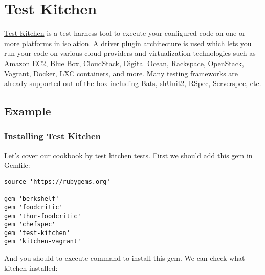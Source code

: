 \section{Test Kitchen}
\label{sec:testing-test-kitchen}

\href{http://kitchen.ci/}{Test Kitchen} is a test harness tool to execute your configured code on one or more platforms in isolation. A driver plugin architecture is used which lets you run your code on various cloud providers and virtualization technologies such as Amazon EC2, Blue Box, CloudStack, Digital Ocean, Rackspace, OpenStack, Vagrant, Docker, LXC containers, and more. Many testing frameworks are already supported out of the box including Bats, shUnit2, RSpec, Serverspec, etc.

\subsection{Example}

\subsubsection{Installing Test Kitchen}

Let's cover our cookbook by test kitchen tests. First we should add this gem in Gemfile:

\begin{lstlisting}[label=lst:testing-test-kitchen1]
source 'https://rubygems.org'

gem 'berkshelf'
gem 'foodcritic'
gem 'thor-foodcritic'
gem 'chefspec'
gem 'test-kitchen'
gem 'kitchen-vagrant'
\end{lstlisting}

And you should to execute  command to install this gem. We can check what kitchen installed:


